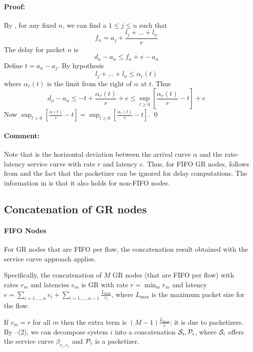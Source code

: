 \paragraph{Proof: } By , for any fixed $n$, we can find a
$1\leq j\leq n$ such that
$$
f_n=a_j + \frac{l_j+...+l_n}{r} $$ The delay for packet $n$ is
 $$
 d_n - a_n \leq f_n + e -a_n
 $$
Define $t=a_n - a_j$. By hypothesis
$$l_j+...+l_n \leq \alpha_r(t)$$
where $\alpha_r(t)$ is the limit from the right of $\alpha$ at $t$.
Thus
 $$d_n -a_n \leq -t + \frac{\alpha_r(t)}{r} + e \leq \sup_{t \geq 0} [\frac{\alpha_r(t)}{r} -  t] + e
 $$
Now $\sup_{t > 0}[\frac{\alpha(t)}{r} -  t]=\sup_{t \geq
0}[\frac{\alpha_r(t)}{r} -  t]$.
 \qed
\paragraph{Comment: }
Note that  is the horizontal deviation between the
arrival curve $\alpha$ and the rate-latency service curve with
rate $r$ and latency $e$. Thus, for FIFO GR nodes,
 follows from  and the
fact that the packetizer can be ignored for delay computations.
The information in  is that it also
holds for non-FIFO nodes.

\subsection{Concatenation of GR nodes}

\paragraph{FIFO Nodes} For GR nodes that are FIFO per flow, the concatenation
result obtained with the service curve approach applies.

\begin{theorem} Specifically, the concatenation of $M$ GR nodes
(that are FIFO per flow) with rates $r_m$ and latencies $e_m$
is GR with rate $r= \min_m r_m$ and latency $e=
\sum_{i=1,...,n} e_i +
\sum_{i=1,...,n-1}\frac{L_{\max}}{r_i}$, where $L_{\max}$ is
the maximum packet size for the flow. 
\end{theorem}If $r_m=r$ for all $m$ then the extra term is $(M-1)\frac{L_{\max}}{r}$; it is due to packetizers.
\pr
By --(2), we can decompose system $i$ into
a concatenation $\mathcal S_i, \mathcal P_i$, where $\mathcal S_i$ offers the
service curve $\beta_{r_i,e_i}$ and $\mathcal P_i$ is a packetizer.


